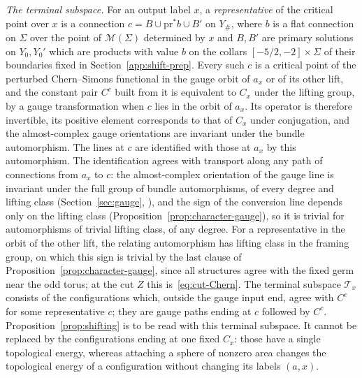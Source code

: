 \documentclass[11pt]{amsart}
\theoremstyle{definition}
\theoremstyle{remark}
\theoremstyle{plain}
\numberwithin{equation}{section}
\begin{document}
\emph{The terminal subspace.} For an output label $x$, a
\emph{representative} of the critical point over $x$ is a connection
$c=B\cup\mathrm{pr}^*b\cup B'$ on $Y_\#$, where $b$ is a flat connection
on $\Sigma$ over the point of $\mathcal M(\Sigma)$ determined by $x$ and
$B,B'$ are primary solutions on $Y_0,Y_0'$ which are products with value
$b$ on the collars $[-5/2,-2]\times\Sigma$ of their boundaries fixed in
Section~\ref{app:shift-prep}. Every such $c$ is a critical
point of the perturbed Chern--Simons functional in the gauge orbit of
$a_x$ or of its other lift, and the constant pair $C^c$ built from it is
equivalent to $C_x$ under the lifting group, by a gauge transformation
when $c$ lies in the orbit of $a_x$. Its operator is therefore invertible, its
positive element corresponds to that of $C_x$ under conjugation, and the
almost-complex gauge orientations are invariant under the bundle
automorphism. The lines at $c$ are identified with those at $a_x$ by this
automorphism. The identification agrees with transport along any path of
connections from $a_x$ to $c$: the almost-complex orientation of the
gauge line is invariant under the full group of bundle automorphisms,
of every degree and lifting class (Section~\ref{sec:gauge},
\cite[Section~5.1]{KM-unknot}), and the sign of the conversion line depends only on the lifting class
(Proposition~\ref{prop:character-gauge}), so it is trivial for
automorphisms of trivial lifting class, of any degree. For a
representative in the orbit of the other lift, the relating automorphism
has lifting class in the framing group, on which this sign is trivial by the last clause of Proposition~\ref{prop:character-gauge},
since all structures agree with the fixed germ near the odd torus; at
the cut $Z$ this is~\eqref{eq:cut-Chern}. The terminal subspace $\mathcal T_x$ consists of the
configurations which, outside the gauge input end, agree with $C^c$ for
some representative $c$; they are gauge paths ending at $c$ followed by
$C^c$. Proposition~\ref{prop:shifting} is to be read with this terminal
subspace. It cannot be replaced by the configurations ending at one fixed
$C_x$: those have a single topological energy, whereas attaching a sphere
of nonzero area changes the topological energy of a configuration without
changing its labels $(a,x)$.
\end{document}
